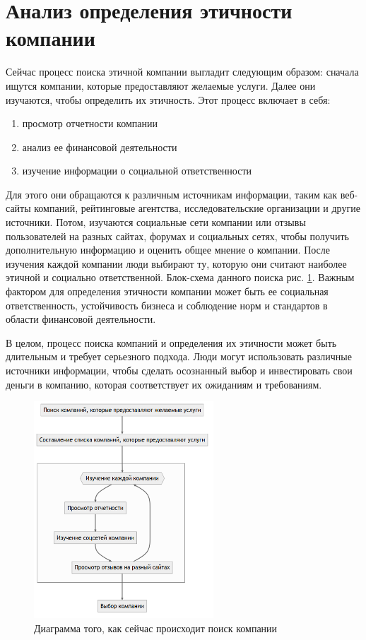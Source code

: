 \documentclass[PI, VKR]{HSEUniversity}
\begin{document}
\section{Анализ определения этичности компании}
\label{sec:orge78d50a}
Сейчас процесс поиска этичной компании выгладит следующим образом: сначала ищутся компании, которые предоставляют желаемые услуги. Далее они изучаются, чтобы определить их этичность. Этот процесс включает в себя:
\begin{enumerate}
\item просмотр отчетности компании
\item анализ ее финансовой деятельности
\item изучение информации о социальной ответственности
\end{enumerate}

Для этого они обращаются к различным источникам информации, таким как веб-сайты компаний, рейтинговые агентства, исследовательские организации и другие источники. Потом, изучаются социальные сети компании или отзывы пользователей на разных сайтах, форумах и социальных сетях, чтобы получить дополнительную информацию и оценить общее мнение о компании. После изучения каждой компании люди выбирают ту, которую они считают наиболее этичной и социально ответственной. Блок-схема данного поиска рис. \ref{fig:as_is}. Важным фактором для определения этичности компании может быть ее социальная ответственность, устойчивость бизнеса и соблюдение норм и стандартов в области финансовой деятельности.

В целом, процесс поиска компаний и определения их этичности может быть длительным и требует серьезного подхода. Люди могут использовать различные источники информации, чтобы сделать осознанный выбор и инвестировать свои деньги в компанию, которая соответствует их ожиданиям и требованиям.
\begin{figure}[h]
\centering
\includegraphics[width=0.6\textwidth]{img/mermaid/as_is.png}
\caption{\label{fig:as_is}Диаграмма того, как сейчас происходит поиск компании}
\end{figure}
\end{document}
